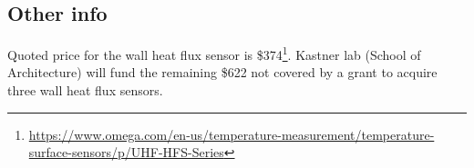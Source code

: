 \documentclass[11pt, notitlepage]{article} %
\begin{document}
\subsection*{Other info}

Quoted price for the wall heat flux sensor is \$374\footnote{\url{https://www.omega.com/en-us/temperature-measurement/temperature-surface-sensors/p/UHF-HFS-Series}}. Kastner lab (School of Architecture) will fund the remaining \$622 not covered by a grant to acquire three wall heat flux sensors.




\printbibliography
\end{document}

